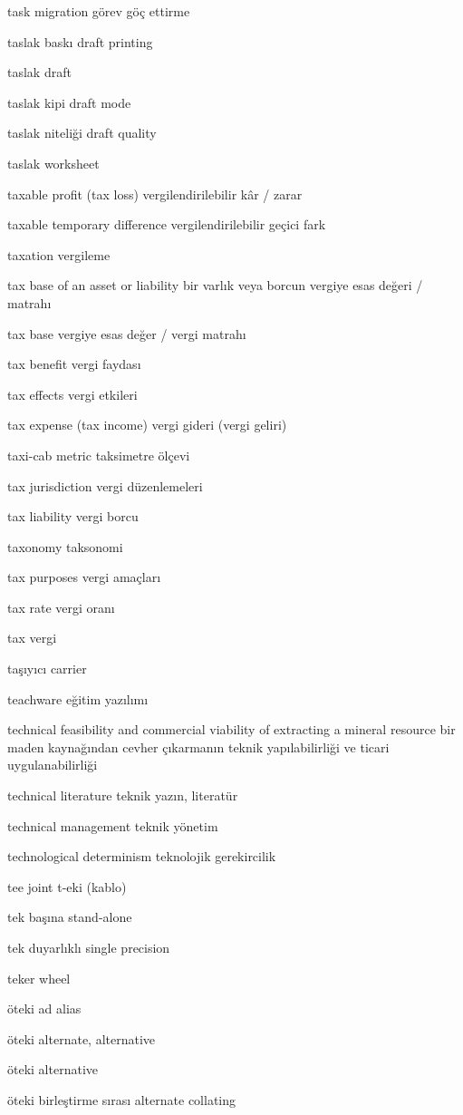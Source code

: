 \documentclass[12pt,fleqn]{article}\usepackage{../../common}
\begin{document}
task migration görev göç ettirme

taslak baskı draft printing

taslak draft

taslak kipi draft mode

taslak niteliği draft quality

taslak worksheet

taxable profit (tax loss) vergilendirilebilir kâr / zarar

taxable temporary difference vergilendirilebilir geçici fark

taxation vergileme

tax base of an asset or liability bir varlık veya borcun vergiye esas değeri / matrahı

tax base vergiye esas değer / vergi matrahı

tax benefit vergi faydası

tax effects vergi etkileri

tax expense (tax income) vergi gideri (vergi geliri)

taxi-cab metric taksimetre ölçevi

tax jurisdiction vergi düzenlemeleri

tax liability vergi borcu

taxonomy taksonomi

tax purposes vergi amaçları

tax rate vergi oranı

tax vergi

taşıyıcı carrier

teachware eğitim yazılımı

technical feasibility and commercial viability of extracting a mineral resource bir maden kaynağından cevher çıkarmanın teknik yapılabilirliği ve ticari uygulanabilirliği

technical literature teknik yazın, literatür

technical management teknik yönetim

technological determinism teknolojik gerekircilik

tee joint t-eki (kablo)

tek başına stand-alone

tek duyarlıklı single precision

teker wheel

öteki ad alias

öteki alternate, alternative

öteki alternative

öteki birleştirme sırası alternate collating
\end{document}
